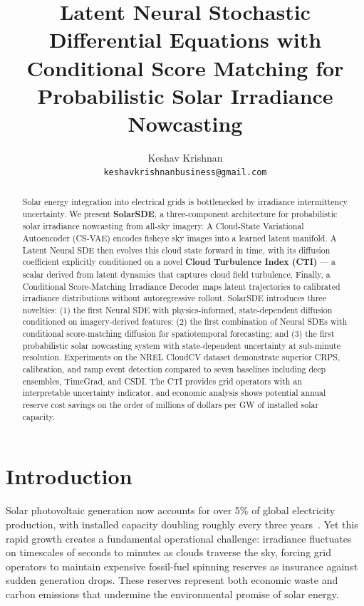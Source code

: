 \documentclass{article}
\title{Latent Neural Stochastic Differential Equations with Conditional Score Matching for Probabilistic Solar Irradiance Nowcasting}
\author{
  Keshav Krishnan \\
  \texttt{keshavkrishnanbusiness@gmail.com}
}
\begin{document}
\maketitle

\begin{abstract}
Solar energy integration into electrical grids is bottlenecked by irradiance intermittency uncertainty. We present \textbf{SolarSDE}, a three-component architecture for probabilistic solar irradiance nowcasting from all-sky imagery. A Cloud-State Variational Autoencoder (CS-VAE) encodes fisheye sky images into a learned latent manifold. A Latent Neural SDE then evolves this cloud state forward in time, with its diffusion coefficient explicitly conditioned on a novel \textbf{Cloud Turbulence Index (CTI)} --- a scalar derived from latent dynamics that captures cloud field turbulence. Finally, a Conditional Score-Matching Irradiance Decoder maps latent trajectories to calibrated irradiance distributions without autoregressive rollout. SolarSDE introduces three novelties: (1) the first Neural SDE with physics-informed, state-dependent diffusion conditioned on imagery-derived features; (2) the first combination of Neural SDEs with conditional score-matching diffusion for spatiotemporal forecasting; and (3) the first probabilistic solar nowcasting system with state-dependent uncertainty at sub-minute resolution. Experiments on the NREL CloudCV dataset demonstrate superior CRPS, calibration, and ramp event detection compared to seven baselines including deep ensembles, TimeGrad, and CSDI. The CTI provides grid operators with an interpretable uncertainty indicator, and economic analysis shows potential annual reserve cost savings on the order of millions of dollars per GW of installed solar capacity.
\end{abstract}

\section{Introduction}
\label{sec:intro}

Solar photovoltaic generation now accounts for over 5\% of global electricity production, with installed capacity doubling roughly every three years~\citep{iea2024}. Yet this rapid growth creates a fundamental operational challenge: irradiance fluctuates on timescales of seconds to minutes as clouds traverse the sky, forcing grid operators to maintain expensive fossil-fuel spinning reserves as insurance against sudden generation drops. These reserves represent both economic waste and carbon emissions that undermine the environmental promise of solar energy.
\end{document}
